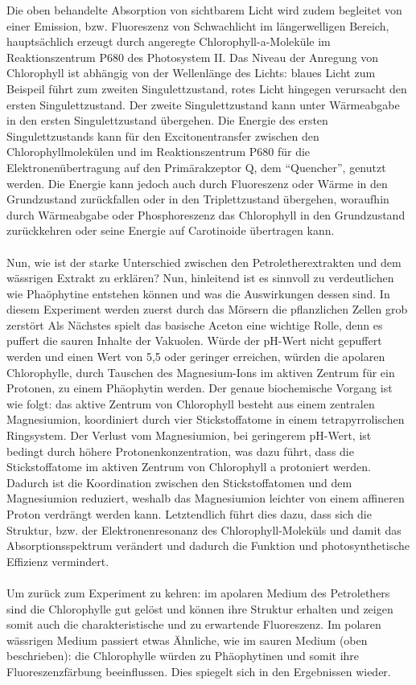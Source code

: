 \documentclass[10pt,a4paper]{article}
\begin{document}
			Die oben behandelte Absorption von sichtbarem Licht wird zudem begleitet von einer Emission, bzw. Fluoreszenz von Schwachlicht im längerwelligen Bereich, hauptsächlich erzeugt durch angeregte Chlorophyll-a-Moleküle im Reaktionszentrum P680 des Photosystem II. Das Niveau der Anregung von Chlorophyll ist abhängig von der Wellenlänge des Lichts: blaues Licht zum Beispeil führt zum zweiten Singulettzustand, rotes Licht hingegen verursacht den ersten Singulettzustand. Der zweite Singulettzustand kann unter Wärmeabgabe in den ersten Singulettzustand übergehen. Die Energie des ersten Singulettzustands kann für den Excitonentransfer zwischen den Chlorophyllmolekülen und im Reaktionszentrum P680 für die Elektronenübertragung auf den Primärakzeptor Q, dem “Quencher”, genutzt werden. Die  Energie kann jedoch auch durch Fluoreszenz oder Wärme in den Grundzustand zurückfallen oder in den Triplettzustand übergehen, woraufhin durch Wärmeabgabe oder Phosphoreszenz das Chlorophyll in den Grundzustand zurückkehren oder seine Energie auf Carotinoide übertragen kann. \\
			\\
			Nun, wie ist der starke Unterschied zwischen den Petroletherextrakten und dem wässrigen Extrakt zu erklären? Nun, hinleitend ist es sinnvoll zu verdeutlichen wie Phaöphytine entstehen können und was die Auswirkungen dessen sind. 
			In diesem Experiment werden zuerst durch das Mörsern die pflanzlichen Zellen grob zerstört Als Nächstes spielt das basische Aceton eine wichtige Rolle, denn es puffert die sauren Inhalte der Vakuolen. Würde der pH-Wert nicht gepuffert werden und einen Wert von 5,5 oder geringer erreichen, würden die apolaren Chlorophylle, durch Tauschen des Magnesium-Ions im aktiven Zentrum für ein Protonen, zu einem Phäophytin werden. 
			Der genaue biochemische Vorgang ist wie folgt: das aktive Zentrum von Chlorophyll besteht aus einem zentralen Magnesiumion, koordiniert durch vier Stickstoffatome in einem tetrapyrrolischen Ringsystem. Der Verlust vom Magnesiumion, bei geringerem pH-Wert, ist bedingt durch höhere Protonenkonzentration, was dazu führt, dass die Stickstoffatome im aktiven Zentrum von Chlorophyll a protoniert werden. Dadurch ist die Koordination zwischen den Stickstoffatomen und dem Magnesiumion reduziert, weshalb das Magnesiumion leichter von einem affineren Proton verdrängt werden kann. Letztendlich führt dies dazu, dass sich die Struktur, bzw. der Elektronenresonanz des Chlorophyll-Moleküls und damit das Absorptionsspektrum verändert und dadurch die Funktion und photosynthetische Effizienz vermindert.\\
			\\
			Um zurück zum Experiment zu kehren: im apolaren Medium des Petrolethers sind die Chlorophylle gut gelöst und können ihre Struktur erhalten und zeigen somit auch die charakteristische und zu erwartende Fluoreszenz. Im polaren wässrigen Medium passiert etwas Ähnliche, wie im sauren Medium (oben beschrieben): die Chlorophylle würden zu Phäophytinen und somit ihre Fluoreszenzfärbung beeinflussen. Dies spiegelt sich in den Ergebnissen wieder. 
		
\end{document}
